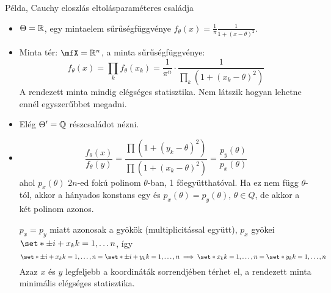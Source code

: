 \documentclass[aspectratio=169,notheorems,9pt,\option]{beamer}
\begin{document}
\begin{frame}{Példa, Cauchy eloszlás eltolásparaméteres családja}
  \begin{itemize}
    \item $\Theta=\mathbb{R}$, egy mintaelem sűrűségfüggvénye 
    $f_{\theta}(x)=\frac1\pi\frac{1}{1+(x-\theta)^2}$.
    \item Minta tér: $\mfX=\real^n$, a minta sűrűségfüggvénye:
    \begin{displaymath}
      f_\theta(x)=\prod_k f_\theta(x_k)
      =\frac1{\pi^n}\cdot\frac1{\prod_k(1+(x_k-\theta)^2)}
    \end{displaymath}
    A rendezett minta mindig elégséges statisztika. 
    Nem látszik hogyan lehetne ennél egyszerűbbet megadni.
    \item Elég $\Theta'=\mathbb{Q}$ részcsaládot nézni.
    \item 
    \begin{displaymath}
      \frac{f_\theta(x)}{f_\theta(y)}
      =\frac{\prod(1+(y_k-\theta)^2)}{\prod(1+(x_k-\theta)^2)} =\frac{p_y(\theta)}{p_x(\theta)}
    \end{displaymath}
    ahol $p_x(\theta)$ $2n$-ed fokú polinom $\theta$-ban, 1 főegyütthatóval. 
    Ha ez nem függ $\theta$-tól, akkor a hányados konstans egy 
    és $p_x(\theta)=p_y(\theta)$, $\theta\in Q$, de akkor a két polinom azonos.

    $p_x=p_y$ miatt azonosak a gyökök (multiplicitással együtt), 
    $p_x$ gyökei $\set*{\pm i+x_k}{k=1,\dots n}$, így 
    \begin{displaymath}
      \set*{\pm i+x_k}{k=1,\dots,n}=\set*{\pm i+ y_k}{k=1,\dots,n}
      \implies\set*{x_k}{k=1,\dots,n}=\set*{y_k}{k=1,\dots,n}
    \end{displaymath}
    Azaz $x$ és $y$ legfeljebb a koordináták sorrendjében 
    térhet el, a rendezett minta minimális elégséges statisztika.
  \end{itemize}
\end{frame}
\end{document}
